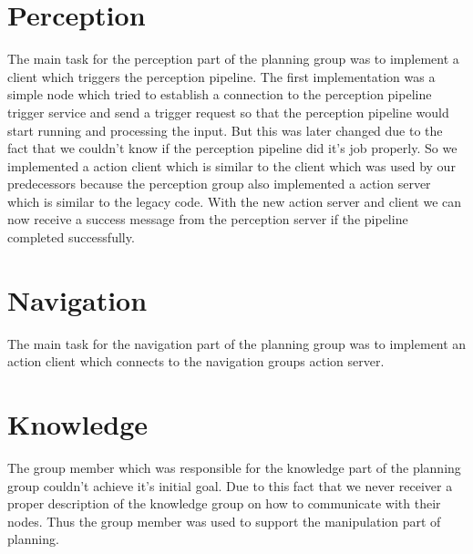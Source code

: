 \documentclass[main.tex]{subfiles}
\begin{document}
		\section{Perception}

		The main task for the perception part of the planning group was to implement a client which triggers the perception pipeline.
		The first implementation was a simple node which tried to establish a connection to the perception pipeline trigger service and send a trigger request so that the perception pipeline would start running and processing the input. But this was later changed due to the fact that we couldn't know if the perception pipeline did it's job properly.
		So we implemented a action client which is similar to the client which was used by our predecessors because the perception group also implemented a action server which is similar to the legacy code. With the new action server and client we can now receive a success message from the perception server if the pipeline completed successfully.

		\section{Navigation}

                The main task for the navigation part of the planning group was to implement an action client which connects to the navigation groups action server.

		\section{Knowledge}

                The group member which was responsible for the knowledge part of the planning group couldn't achieve it's initial goal. Due to this fact that we never receiver a proper description of the knowledge group on how to communicate with their nodes. Thus the group member was used to support the manipulation part of planning.
\end{document}
